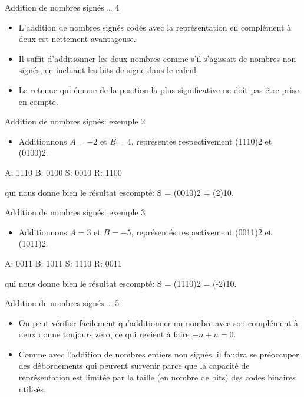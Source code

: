 \documentclass[presentation]{beamer}
\begin{document}
\begin{frame}[label={sec:org232d8d0}]{Addition de nombres signés \ldots{} 4}
\begin{itemize}
\item L'addition de nombres signés codés avec la représentation en complément à deux est nettement avantageuse.

\item Il suffit d'additionner les deux nombres comme s'il s'agissait de nombres non signés, en incluant les bits de signe dans le calcul.

\item La retenue qui émane de la position la plus significative ne doit pas être prise en compte.
\end{itemize}
\end{frame}

\begin{frame}[label={sec:org26d7135}]{Addition de nombres signés: exemple 2}
\begin{itemize}
\item Additionnons \(A=-2\) et \(B=4\), représentés respectivement (1110)2 et (0100)2.
\end{itemize}

A: 1110
B: 0100
S: 0010
R: 1100

qui nous donne bien le résultat escompté: S = (0010)2 = (2)10.
\end{frame}

\begin{frame}[label={sec:orgdcca395}]{Addition de nombres signés: exemple 3}
\begin{itemize}
\item Additionnons \(A=3\) et \(B=-5\), représentés respectivement (0011)2 et (1011)2.
\end{itemize}

A: 0011
B: 1011
S: 1110
R: 0011

qui nous donne bien le résultat escompté: S = (1110)2 = (-2)10.
\end{frame}

\begin{frame}[label={sec:orgf7317c8}]{Addition de nombres signés \ldots{} 5}
\begin{itemize}
\item On peut vérifier facilement qu'additionner un nombre avec son complément à deux donne toujours zéro, ce qui revient à faire \(-n + n = 0\).

\item Comme avec l'addition de nombres entiers non signés, il faudra se préoccuper des débordements qui peuvent survenir parce que la capacité de représentation est limitée par la taille (en nombre de bits) des codes binaires utilisés.
\end{itemize}
\end{frame}
\end{document}
